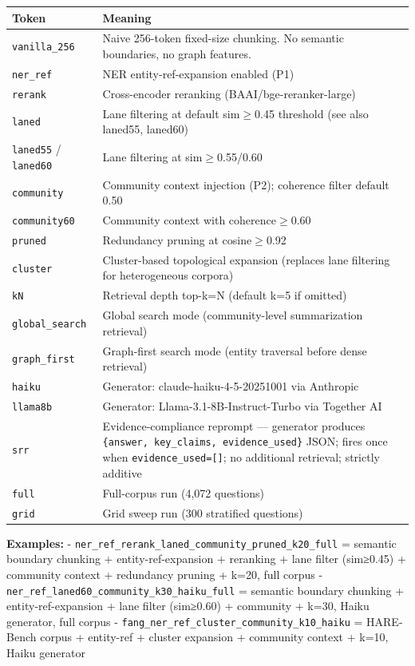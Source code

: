 \begin{small}
\setlength{\tabcolsep}{4pt}
\begin{longtable}{p{1.2in}p{5.0in}}
\toprule
\textbf{Token} & \textbf{Meaning} \\
\midrule
\endhead
\texttt{vanilla\_256} & Naive 256-token fixed-size chunking. No semantic boundaries, no graph features. \\
\texttt{ner\_ref} & NER entity-ref-expansion enabled (P1) \\
\texttt{rerank} & Cross-encoder reranking (BAAI/bge-reranker-large) \\
\texttt{laned} & Lane filtering at default sim$\geq$0.45 threshold (see also laned55, laned60) \\
\texttt{laned55} / \texttt{laned60} & Lane filtering at sim$\geq$0.55/0.60 \\
\texttt{community} & Community context injection (P2); coherence filter default 0.50 \\
\texttt{community60} & Community context with coherence$\geq$0.60 \\
\texttt{pruned} & Redundancy pruning at cosine$\geq$0.92 \\
\texttt{cluster} & Cluster-based topological expansion (replaces lane filtering for heterogeneous corpora) \\
\texttt{kN} & Retrieval depth top-k=N (default k=5 if omitted) \\
\texttt{global\_search} & Global search mode (community-level summarization retrieval) \\
\texttt{graph\_first} & Graph-first search mode (entity traversal before dense retrieval) \\
\texttt{haiku} & Generator: claude-haiku-4-5-20251001 via Anthropic \\
\texttt{llama8b} & Generator: Llama-3.1-8B-Instruct-Turbo via Together AI \\
\texttt{srr} & Evidence-compliance reprompt — generator produces \texttt{\{answer, key\_claims, evidence\_used\}} JSON; fires once when \texttt{evidence\_used=[]}; no additional retrieval; strictly additive \\
\texttt{full} & Full-corpus run (4,072 questions) \\
\texttt{grid} & Grid sweep run (300 stratified questions) \\
\bottomrule
\end{longtable}
\end{small}

\textbf{Examples:} - \texttt{ner\_ref\_rerank\_laned\_community\_pruned\_k20\_full} = semantic boundary chunking + entity-ref-expansion + reranking + lane filter (sim≥0.45) + community context + redundancy pruning + k=20, full corpus - \texttt{ner\_ref\_laned60\_community\_k30\_haiku\_full} = semantic boundary chunking + entity-ref-expansion + lane filter (sim≥0.60) + community + k=30, Haiku generator, full corpus - \texttt{fang\_ner\_ref\_cluster\_community\_k10\_haiku} = HARE-Bench corpus + entity-ref + cluster expansion + community context + k=10, Haiku generator
